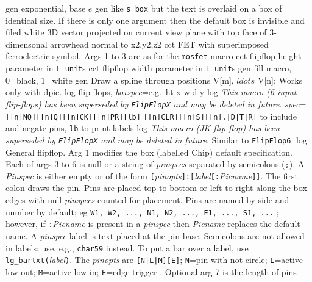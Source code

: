   {gen}
  {exponential, base $e$}
%
  {gen}
  {like {\tt s\_box} but the text is overlaid on a box of identical size.
   If there is only one argument then the default box
   is invisible and filed white
    }
  {3D}
  {vector projected on current view plane with top face
   of 3-dimensonal arrowhead normal to x2,y2,z2 }
  {cct}
  {FET with superimposed ferroelectric symbol. Args 1 to 3 are as for
   the {\tt mosfet} macro
    }
  {cct}
  {flipflop height parameter in {\tt L\_unit}s}
  {cct}
  {flipflop width parameter in {\tt L\_unit}s}
  {gen}
  {fill macro, 0=black, 1=white}
  {gen}
  {Draw a spline through positions V[m], $ldots$ V[n]: Works only with dpic.}
  {log}
  {flip-flops,
  {\sl boxspec}=e.g.\ ht x wid y }
  {log}
  {{\em This macro (6-input flip-flops)
    has been superseded by {\tt FlipFlopX} and may be deleted
    in future}.
    {\sl spec}={\tt [[n]NQ][[n]Q][[n]CK][[n]PR][lb]}
    {\tt [[n]CLR][[n]S][[n].|D|T|R]} to include and negate pins,
    {\tt lb} to print labels }
  {log}
  {{\em This macro (JK flip-flop)
    has been superseded by {\tt FlipFlopX} and may be deleted
    in future}.
   Similar to {\tt FlipFlop6}.}
  {log}
  {General flipflop.
   Arg 1 modifies the box (labelled Chip) default specification.
   Each of args 3 to 6 is null or a string of {\sl pinspecs}
   separated by semicolons ({\tt;}).  A {\sl Pinspec} is either empty
   or of the form
   {\tt[}{\sl pinopts}{\tt]:[}{\sl label}{\tt[:}{\sl Picname}{\tt]]}.
   The first colon draws the pin.
   Pins are placed top to bottom or left to right along the box edges with
   null {\sl pinspecs} counted for placement. Pins are named by side and number
   by default; eg {\tt W1, W2, ..., N1, N2, ..., E1, ..., S1, ...} ; however,
   if {\tt:}{\sl Picname} is present in a {\sl pinspec} then {\sl Picname}
   replaces the default name.
   A {\sl pinspec} label is text placed at the pin base. Semicolons are
   not allowed in labels; use, e.g., {\tt {}char59}
   instead.
   To put a bar over a label, use {\tt lg\_bartxt(}{\sl label}{\tt)}.
   The {\sl pinopts} are {\tt[N|L|M][E]};
 {\tt N}=pin with not circle;
 {\tt L}=active low out; {\tt M}=active low in;
 {\tt E}=edge trigger . Optional arg 7 is the length
 of pins}
